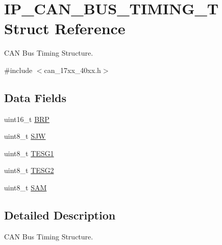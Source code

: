 \hypertarget{structIP__CAN__BUS__TIMING__T}{\section{I\-P\-\_\-\-C\-A\-N\-\_\-\-B\-U\-S\-\_\-\-T\-I\-M\-I\-N\-G\-\_\-\-T Struct Reference}
\label{structIP__CAN__BUS__TIMING__T}
}


C\-A\-N Bus Timing Structure.  




{\ttfamily \#include $<$can\-\_\-17xx\-\_\-40xx.\-h$>$}

\subsection*{Data Fields}
\begin{DoxyCompactItemize}
\item 
uint16\-\_\-t \hyperlink{structIP__CAN__BUS__TIMING__T_a18fb5e94652c78dd8468b7a374699643}{B\-R\-P}
\item 
uint8\-\_\-t \hyperlink{structIP__CAN__BUS__TIMING__T_a6f3d35851d3119d9d04096d08d41d289}{S\-J\-W}
\item 
uint8\-\_\-t \hyperlink{structIP__CAN__BUS__TIMING__T_ad1295003e524b683f247ea0dd4372380}{T\-E\-S\-G1}
\item 
uint8\-\_\-t \hyperlink{structIP__CAN__BUS__TIMING__T_a67805cda8a3bb4be441ac2ebd25ed3a7}{T\-E\-S\-G2}
\item 
uint8\-\_\-t \hyperlink{structIP__CAN__BUS__TIMING__T_a3313ced0f84d23e3caf050a530119fb9}{S\-A\-M}
\end{DoxyCompactItemize}


\subsection{Detailed Description}
C\-A\-N Bus Timing Structure. 

